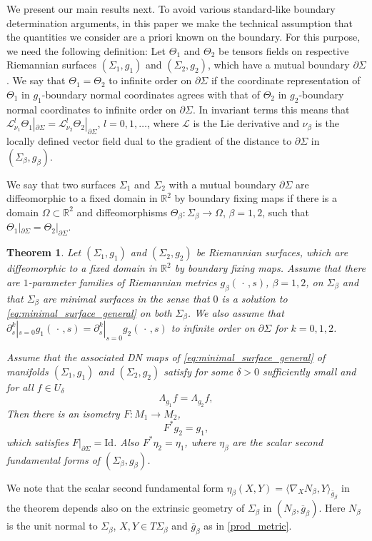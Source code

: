 \documentclass[12pt]{amsart}
\def\p{\partial}
\def\R{\mathbb R}
\newtheorem{theorem}{Theorem}[section]
\theoremstyle{definition}
\theoremstyle{remark}
\newcommand{\ccdot}{\,\cdot\,}
\begin{document}
We present our main results next. To avoid various standard-like boundary determination arguments, in this paper we make the technical assumption that the quantities we consider are a priori known on the boundary. For this purpose, we need the following definition: Let $\Theta_1$ and $\Theta_2$ be tensors fields on respective Riemannian surfaces $(\Sigma_1,g_1)$ and $(\Sigma_2,g_2)$, which have a mutual boundary $\p \Sigma$. We say that $\Theta_1=\Theta_2$ to infinite order on $\p\Sigma$ if the coordinate representation of $\Theta_1$ in $g_1$-boundary normal coordinates agrees with that of $\Theta_2$ in $g_2$-boundary normal coordinates to infinite order on $\p \Sigma$. In invariant terms this means that $\mathcal{L}_{\nu_1}^l\Theta_1|_{\p \Sigma}=\mathcal{L}_{\nu_2}^l\Theta_2|_{\p \Sigma}$, $l=0,1,\ldots$, where $\mathcal{L}$ is the Lie derivative and $\nu_\beta$ is the locally defined vector field dual to the gradient of the distance to $\p \Sigma$ in $(\Sigma_\beta,g_\beta)$. 

We say that two surfaces $\Sigma_1$ and $\Sigma_2$ with a mutual boundary $\p \Sigma$ are diffeomorphic to a fixed domain in $\R^2$ by boundary fixing maps if there is a domain $\Omega\subset \R^2$ and diffeomorphisms $\Theta_\beta:\Sigma_\beta\to \Omega$, $\beta=1,2$, such that $\Theta_1|_{\p \Sigma}=\Theta_2|_{\p \Sigma}$.
\begin{theorem}\label{thm:main}
Let $(\Sigma_1, g_1)$ and $(\Sigma_2,g_2)$ be Riemannian surfaces, which are diffeomorphic to a fixed domain in $\R^2$ by boundary fixing maps. Assume that there are $1$-parameter families of Riemannian metrics $g_\beta(\ccdot,s)$, $\beta=1,2$, on $\Sigma_\beta$ and that $\Sigma_\beta$ are minimal surfaces in the sense that $0$ is a solution to \eqref{eq:minimal_surface_general} on both $\Sigma_\beta$. We also assume that $\p_s^k|_{s=0}g_1(\ccdot,s)=\p_s^k|_{s=0}g_2(\ccdot,s)$ to infinite order on $\p \Sigma$ for $k=0,1,2$.

Assume that the associated DN maps of \eqref{eq:minimal_surface_general} of manifolds $(\Sigma_1,g_1)$ and $(\Sigma_2,g_2)$ satisfy
for some $\delta>0$ sufficiently small and for all $f\in U_\delta$ 
\[
\Lambda_{g_1}f = \Lambda_{g_2}f,
\]
Then there is an isometry $F:M_1\to M_2$, 
\[
  F^*g_2=g_1,
\]
which satisfies $F|_{\p \Sigma}=\textrm{Id}$. Also $F^*\eta_2=\eta_1$, where $\eta_\beta$ are the scalar second fundamental forms of $(\Sigma_\beta,g_\beta)$. 
\end{theorem}
We note that the scalar second fundamental form $\eta_\beta(X,Y)=\langle \nabla_XN_\beta, Y\rangle_{\overline g_\beta}$ in the theorem depends also on the extrinsic geometry of $\Sigma_\beta$ in $(N_\beta, \overline g_\beta)$. Here $N_\beta$ is the unit normal to $\Sigma_\beta$, $X,Y\in T\Sigma_\beta$ and $\overline g_\beta$ as in \eqref{prod_metric}.
\end{document}
